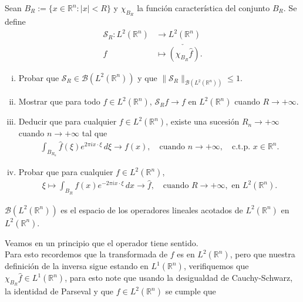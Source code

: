 \begin{homeworkProblem}
  Sean $B_R := \{x \in \mathbb{R}^n : |x| < R\}$ y $\chi_{B_R}$ la función característica del conjunto $B_R$. Se define
  \begin{align*}
    \mathcal{S}_{R}:L^2(\mathbb{R}^n) &\longrightarrow L^2(\mathbb{R}^n)\\
    f &\longmapsto \check{\left(\chi_{B_R} \hat{f} \right)}.   
  \end{align*}
  \begin{enumerate}[(i)]
    \item Probar que $\mathcal{S}_{R} \in \mathcal{B}(L^2(\mathbb{R}^n))$ y que $\|\mathcal{S}_{R}\|_{\mathcal{B}(L^2(\mathbb{R}^n))} \leq 1$.
    \item Mostrar que para todo $f \in L^2(\mathbb{R}^n)$, $\mathcal{S}_R f \to f$ en $L^2(\mathbb{R}^n)$ cuando $R \to +\infty$.
    \item Deducir que para cualquier $f \in L^2(\mathbb{R}^n)$, existe una sucesión $R_n \to +\infty$ cuando $n \to +\infty$ tal que
      \begin{align*}
        \int_{B_{R_n}} \widehat{f}(\xi) e^{2\pi i x \cdot \xi} \, d\xi \longrightarrow f(x), \quad \text{cuando } n \to +\infty, \quad \text{c.t.p. } x \in \mathbb{R}^n.
      \end{align*}
    \item Probar que para cualquier $f \in L^2(\mathbb{R}^n)$,
      \begin{align*}
        \xi \longmapsto \int_{B_R} f(x) e^{-2\pi i x \cdot \xi} \, dx \longrightarrow \hat{f}, \quad \text{cuando } R \to +\infty, \text{ en } L^2(\mathbb{R}^n).
      \end{align*}
  \end{enumerate}
  \begin{solution}
    \begin{note}{}
      $\mathcal{B}(L^2(\mathbb{R}^{n}))$ es el espacio de los operadores lineales acotados de $L^2(\mathbb{R}^{n})$ en $L^2(\mathbb{R}^{n})$.  
    \end{note}
    \begin{note}{}
      Veamos en un principio que el operador tiene sentido.\\
      Para esto recordemos que la transformada de $f$ es en $L^2(\mathbb{R}^{n})$, pero que nuestra definición de la inversa sigue estando en $L^1(\mathbb{R}^{n})$, verifiquemos que $\chi_{B_R}\hat{f}\in L^1(\mathbb{R}^{n})$, para esto note que usando la desigualdad de Cauchy-Schwarz, la identidad de Parseval y que $f\in L^2(\mathbb{R}^{n})$ se cumple que

\end{note}
\end{solution}
\end{homeworkProblem}
